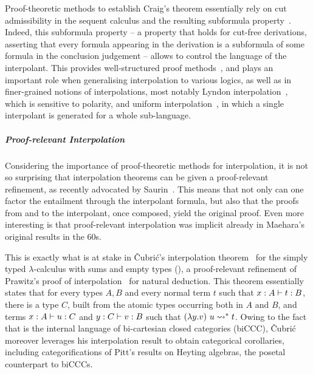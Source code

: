 \documentclass[a4paper,UKenglish,cleveref, autoref, thm-restate]{lipics-v2021}
\begin{document}
Proof-theoretic methods to establish Craig's theorem essentially rely on
cut admissibility in the sequent calculus and the resulting subformula property~\cite{Maehara,Prawitz1965-PRANDA}. Indeed, this subformula property -- a property that holds for cut-free derivations, asserting that every formula appearing in the derivation is a subformula of some formula in the conclusion judgement -- allows to control the language of the interpolant. 
This provides well-structured proof methods~\cite{Maehara,Prawitz1965-PRANDA,Takeuti2013proof,Schutte,Troelstra_Schwichtenberg_2000},
and plays an important role when generalising interpolation to various logics,
as well as in finer-grained notions of interpolations, most notably Lyndon interpolation~\cite{Lyndon1959interpolation}, which is sensitive to polarity, and uniform interpolation~\cite{Pitts92},
in which a single interpolant is generated for a whole sub-language.


\subparagraph*{Proof-relevant Interpolation}
Considering the importance of proof-theoretic methods for interpolation, it is not so surprising that interpolation theorems can be given a proof-relevant refinement, as recently advocated by Saurin~\cite{Saurin25fscd}. This means that not only can one factor the entailment through the interpolant formula, but also that
the proofs from and to the interpolant, once composed, yield the original proof.
Even more interesting is that proof-relevant interpolation was implicit already
in Maehara's original results in the 60s.

This is exactly what is at stake in \v Cubri\'c's interpolation theorem~\cite{Cubricphd,Cubric1994} for the simply typed \(\lambda\)-calculus with sums and empty types (\stlcp), a proof-relevant refinement of Prawitz's proof of interpolation~\cite{Prawitz1965-PRANDA} for natural deduction. 
This theorem essentially states that for every types $A,B$ and every normal term $t$
such that $\typing{x: A}{t}[B]$, there is a type $C$, built from the atomic types occurring both in $A$ and $B$, and terms $\typing{x: A}{u}[C]$ and $\typing{y: C}{v}[B]$ such that 
$(\lambda y. v)~u \rightsquigarrow^* t$.
Owing to the fact that \stlcp is the internal language
of bi-cartesian closed categories (biCCC), \v Cubri\'c moreover
leverages his interpolation result to obtain categorical corollaries,
including categorifications of Pitt's results on Heyting algebras, the
posetal counterpart to biCCCs.
\end{document}
